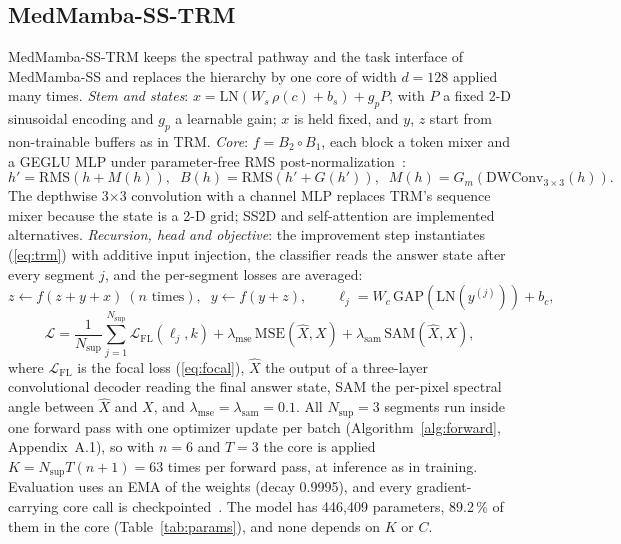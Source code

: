 \documentclass{svproc}
\begin{document}
\subsection{MedMamba-SS-TRM}\label{sec:sstrm}
MedMamba-SS-TRM keeps the spectral pathway and the task interface of MedMamba-SS and replaces the hierarchy by one core of width $d = 128$ applied many times. \emph{Stem and states}: $x = \mathrm{LN}(W_s\, \rho(c) + b_s) + g_p P$, with $P$ a fixed 2-D sinusoidal encoding and $g_p$ a learnable gain; $x$ is held fixed, and $y$, $z$ start from non-trainable buffers as in TRM. \emph{Core}: $f = B_2 \circ B_1$, each block a token mixer and a GEGLU MLP under parameter-free RMS post-normalization~\cite{rmsnorm}:
\begin{equation}
h' = \mathrm{RMS}(h + M(h)), \;\; B(h) = \mathrm{RMS}(h' + G(h')), \;\; M(h) = G_m(\mathrm{DWConv}_{3\times3}(h)).
\label{eq:core}
\end{equation}
The depthwise 3$\times$3 convolution with a channel MLP replaces TRM's sequence mixer because the state is a 2-D grid; SS2D and self-attention are implemented alternatives. \emph{Recursion, head and objective}: the improvement step instantiates (\ref{eq:trm}) with additive input injection, the classifier reads the answer state after every segment $j$, and the per-segment losses are averaged:
\begin{equation}
z \leftarrow f(z + y + x)\ (n \text{ times}), \;\; y \leftarrow f(y + z), \qquad \ell_j = W_c\, \mathrm{GAP}(\mathrm{LN}(y^{(j)})) + b_c,
\label{eq:recursion}
\end{equation}
\begin{equation}
\mathcal{L} = \frac{1}{N_{\text{sup}}} \sum_{j=1}^{N_{\text{sup}}} \mathcal{L}_{\text{FL}}(\ell_j, k) + \lambda_{\text{mse}}\, \mathrm{MSE}(\hat{X}, X) + \lambda_{\text{sam}}\, \mathrm{SAM}(\hat{X}, X),
\label{eq:loss}
\end{equation}
where $\mathcal{L}_{\text{FL}}$ is the focal loss (\ref{eq:focal}), $\hat{X}$ the output of a three-layer convolutional decoder reading the final answer state, SAM the per-pixel spectral angle between $\hat{X}$ and $X$, and $\lambda_{\text{mse}} = \lambda_{\text{sam}} = 0.1$. All $N_{\text{sup}} = 3$ segments run inside one forward pass with one optimizer update per batch (Algorithm~\ref{alg:forward}, Appendix~A.1), so with $n = 6$ and $T = 3$ the core is applied $K = N_{\text{sup}} T (n+1) = 63$ times per forward pass, at inference as in training. Evaluation uses an EMA of the weights (decay 0.9995), and every gradient-carrying core call is checkpointed~\cite{checkpointing}. The model has 446,409 parameters, 89.2\,\% of them in the core (Table~\ref{tab:params}), and none depends on $K$ or $C$.
\end{document}
